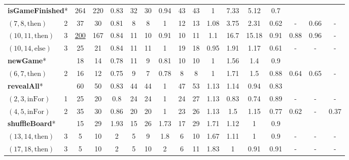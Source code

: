 \documentclass[sigconf]{acmart}
\newcommand{\thenBr}{\text{then}}
\newcommand{\elseBr}{\text{else}}
\newcommand{\inFor}{\text{inFor}}
\newcommand{\un}[1]{\underline{#1}}
\begin{document}
\begin{table}[!t]
\begin{tabular}{lc|ccc|ccc|ccc|ccc|ccc}
\multicolumn{2}{l|}{\textbf{isGameFinished}*} 
                                 & 264      & 220  & 0.83      & 32 & 30 & 0.94             & 43 & 43 & 1                  & 7.33 & 5.12  & 0.7    &      &      &        \\
    $(7,8,\thenBr)$   & 2        & 37       & 30   & 0.81      & 8  & 8  & 1                & 12 & 13 & 1.08               & 3.75 & 2.31  & 0.62   & -  & 0.66 & -   \\
    $(10,11,\thenBr)$ & 3        & \un{200} & 167  & 0.84      & 11 & 10 & 0.91             & 10 & 11 & 1.1                & 16.7 & 15.18 & 0.91   & 0.88 & 0.96 & -   \\
    $(10,14,\elseBr)$ & 3        & 25       & 21   & 0.84      & 11 & 11 & 1                & 19 & 18 & 0.95               & 1.91 & 1.17  & 0.61   & - & - & -   \\
    \hline
    \multicolumn{2}{l|}{\textbf{newGame}*}   
                                 & 18       & 14   & 0.78      & 11 & 9  & 0.81             & 10 & 10 & 1                  & 1.56 & 1.4   & 0.9    &      &      &      \\
    $(6,7,\thenBr)$   & 2        & 16       & 12   & 0.75      & 9  & 7  & 0.78             & 8  & 8  & 1                  & 1.71 & 1.5   & 0.88   & 0.64 & 0.65 & -  \\
    \hline
    \multicolumn{2}{l|}{\textbf{revealAll}*}  
                                 & 60       & 50   & 0.83      & 44 & 44 & 1                & 47 & 53 & 1.13               & 1.14 & 0.94  & 0.83   &      &      &        \\
    $(2,3,\inFor)$    & 1        & 25       & 20   & 0.8       & 24 & 24 & 1                & 24 & 27 & 1.13               & 0.83 & 0.74  & 0.89   & - & - & -  \\
    $(4,5,\inFor)$    & 2        & 35       & 30   & 0.86      & 20 & 20 & 1                & 23 & 26 & 1.13               & 1.5  & 1.15  & 0.77   & 0.62 & -   &  0.37  \\
    \hline
\multicolumn{2}{l|}{\textbf{shuffleBoard}*}   
                                 & 15       & 29   & 1.93      & 15 & 26 & 1.73             & 17 & 29 & 1.71               & 1.12 & 1     & 0.9    &      &      &       \\
    $(13,14,\thenBr)$ & 3        & 5        & 10   & 2         & 5  & 9  & 1.8              & 6  & 10 & 1.67               & 1.11 & 1     & 0.9    & - & - & -  \\
    $(17,18,\thenBr)$ & 3        & 5        & 10   & 2         & 5  & 10 & 2                & 6  & 11 & 1.83               & 1    & 0.91  & 0.91   & - & - & -   \\

\end{tabular}
\end{table}
\end{document}
